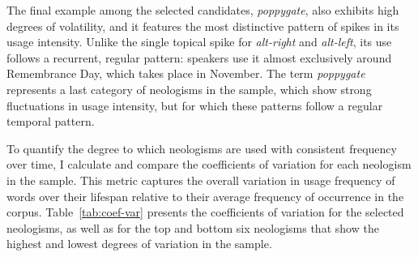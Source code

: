 \documentclass[
  a4paper,
  abstract=on,
  captions=tableabove,
  ]{scrartcl}
\newcommand{\ol}[1]{\emph{#1}}
\begin{document}
      The final example among the selected candidates, \ol{poppygate}, also exhibits high degrees of volatility, and it features the most distinctive pattern of spikes in its usage intensity. Unlike the single topical spike for \ol{alt-right} and \ol{alt-left}, its use follows a recurrent, regular pattern: speakers use it almost exclusively around Remembrance Day, which takes place in November. The term \ol{poppygate} represents a last category of neologisms in the sample, which show strong fluctuations in usage intensity, but for which these patterns follow a regular temporal pattern. 

      To quantify the degree to which neologisms are used with consistent frequency over time, I calculate and compare the coefficients of variation for each neologism in the sample. This metric captures the overall variation in usage frequency of words over their lifespan relative to their average frequency of occurrence in the corpus. Table~\ref{tab:coef-var} presents the coefficients of variation for the selected neologisms, as well as for the top and bottom six neologisms that show the highest and lowest degrees of variation in the sample.
\end{document}
